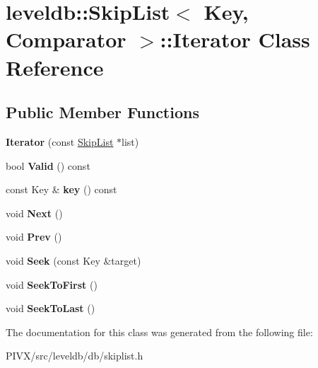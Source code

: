 \hypertarget{classleveldb_1_1_skip_list_1_1_iterator}{}\section{leveldb\+:\+:Skip\+List$<$ Key, Comparator $>$\+:\+:Iterator Class Reference}
\label{classleveldb_1_1_skip_list_1_1_iterator}
\subsection*{Public Member Functions}
\begin{DoxyCompactItemize}
\item 
\mbox{\label{classleveldb_1_1_skip_list_1_1_iterator_ab27d6dd0959d67ed26f2bd451c18270c}} 
{\bfseries Iterator} (const \mbox{\hyperlink{classleveldb_1_1_skip_list}{Skip\+List}} $\ast$list)
\item 
\mbox{\label{classleveldb_1_1_skip_list_1_1_iterator_a6eaf87cf7b2a58908ea3d8f9cccc606f}} 
bool {\bfseries Valid} () const
\item 
\mbox{\label{classleveldb_1_1_skip_list_1_1_iterator_a8b9bc9940fbf067a3fb500ebae6999be}} 
const Key \& {\bfseries key} () const
\item 
\mbox{\label{classleveldb_1_1_skip_list_1_1_iterator_ade5a684c74056f578f85237735da0cef}} 
void {\bfseries Next} ()
\item 
\mbox{\label{classleveldb_1_1_skip_list_1_1_iterator_a10dbaf45640ab2b9f61a96c82e7227e5}} 
void {\bfseries Prev} ()
\item 
\mbox{\label{classleveldb_1_1_skip_list_1_1_iterator_a6c641d5cd37386abdb0aa8d73454611a}} 
void {\bfseries Seek} (const Key \&target)
\item 
\mbox{\label{classleveldb_1_1_skip_list_1_1_iterator_adf69c04f0480a66f10a125c49e19caa7}} 
void {\bfseries Seek\+To\+First} ()
\item 
\mbox{\label{classleveldb_1_1_skip_list_1_1_iterator_afe892ff436137b85216c2ed124f3c6dd}} 
void {\bfseries Seek\+To\+Last} ()
\end{DoxyCompactItemize}


The documentation for this class was generated from the following file\+:\begin{DoxyCompactItemize}
\item 
P\+I\+V\+X/src/leveldb/db/skiplist.\+h\end{DoxyCompactItemize}
